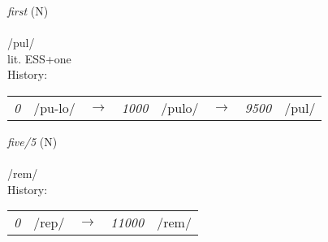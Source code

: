 \vspace{15pt}
\begin{nopagebreak}
 \textit{first} (N)\\
\\
\noindent /p{\textprimstress}ul/\\
\noindent lit. ESS+one\\


\noindent History:

\vspace{-0pt}
\hspace{40pt}
\begin{tabular}{ccc}
\textit{0} & /pu-lo/&$\rightarrow$ & \textit{1000} & /pulo/&$\rightarrow$ & \textit{9500} & /pul/& \\
\end{tabular}

\vspace{20pt}\hline

\end{nopagebreak}
\filbreak



\vspace{15pt}
\begin{nopagebreak}
 \textit{five/5} (N)\\
\\
\noindent /r{\textprimstress}em/\\


\noindent History:

\vspace{-0pt}
\hspace{40pt}
\begin{tabular}{ccc}
\textit{0} & /rep/&$\rightarrow$ & \textit{11000} & /rem/& \\
\end{tabular}

\vspace{20pt}\hline

\end{nopagebreak}
\filbreak



